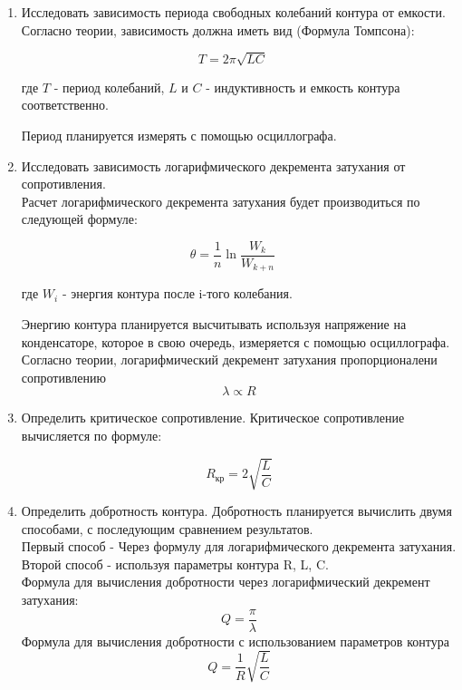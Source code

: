 \documentclass[a4paper, 12pt]{article}%
\begin{document}
\begin{enumerate}
    \item Исследовать зависимость периода свободных колебаний контура от емкости. Согласно теории, зависимость должна иметь вид (Формула Томпсона):

\begin{equation}
    T = 2\pi \sqrt{LC} \quad
\end{equation}
    

    где $T$ - период колебаний, $L$ и $C$ - индуктивность и емкость контура соответственно.

    Период планируется измерять с помощью осциллографа.

    \item Исследовать зависимость логарифмического декремента затухания от сопротивления. \\ Расчет логарифмического декремента затухания будет производиться по следующей формуле:

\begin{equation}
	\theta = \frac{1}{n} \ln\frac{W_k}{W_{k+n}} \quad    
\end{equation}
    

    где $W_i$ - энергия контура после i-того колебания.

    Энергию контура планируется высчитывать используя напряжение на конденсаторе, которое в свою очередь, измеряется с помощью осциллографа. \\

    
Согласно теории, логарифмический декремент затухания пропорционалени сопротивлению
\begin{equation}
	\lambda \propto R
\end{equation}
    
    \newpage

    \item Определить критическое сопротивление. Критическое сопротивление вычисляется по формуле:

\begin{equation}
	R_\text{кр} = 2\sqrt{\frac{L}{C}}
\end{equation}
   

    \item Определить добротность контура. Добротность планируется вычислить двумя способами, с последующим сравнением результатов. \\

    Первый способ - Через формулу для логарифмического декремента затухания. \\
    Второй способ - используя параметры контура R, L, C. \\[0.1cm]

    Формула для вычисления добротности через логарифмический декремент затухания:
\begin{equation}
	Q = \frac{\pi}{\lambda}
\end{equation}
    Формула для вычисления добротности с использованием параметров контура
\begin{equation}
 	Q = \frac{1}{R} \sqrt{\frac{L}{C}}
\end{equation}

\end{enumerate}
\end{document}
